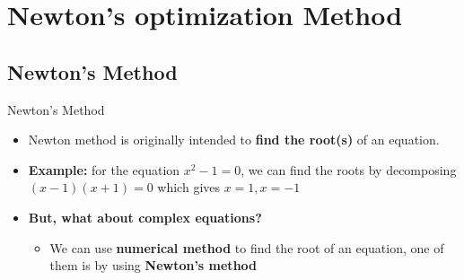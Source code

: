 \documentclass[serif, aspectratio=169]{beamer}
\begin{document}
\section{Newton's optimization Method}
\subsection{Newton's Method}
\begin{frame}{Newton's Method}
\begin{itemize}
    \item Newton method is originally intended to \textbf{find the root(s)} of an equation.
    \item \textbf{Example:} for the equation $x^2 - 1 = 0$, we can find the roots by decomposing $(x-1)(x+1)=0$ which gives $x=1, x=-1$
    \item \textbf{But, what about complex equations?}
    \begin{itemize}
        \item We can use \textbf{numerical method} to find the root of an equation, one of them is by using \textbf{Newton’s method}
    \end{itemize}
\end{itemize}
\end{frame}
\end{document}
